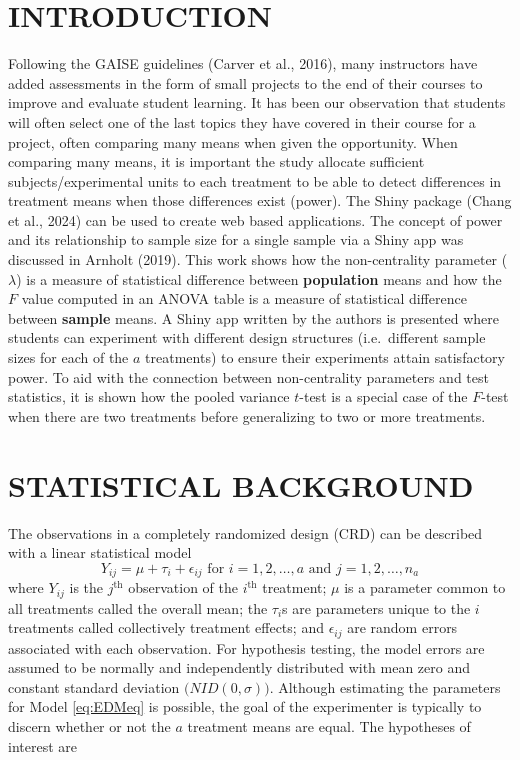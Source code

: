 \documentclass[
]{article}
\begin{document}
\hypertarget{introduction}{%
\section*{INTRODUCTION}\label{introduction}}

Following the GAISE guidelines (Carver et al., 2016), many instructors have added assessments in the form of small projects to the end of their courses to improve and evaluate student learning. It has been our observation that students will often select one of the last topics they have covered in their course for a project, often comparing many means when given the opportunity. When comparing many means, it is important the study allocate sufficient subjects/experimental units to each treatment to be able to detect differences in treatment means when those differences exist (power). The Shiny package (Chang et al., 2024) can be used to create web based applications. The concept of power and its relationship to sample size for a single sample via a Shiny app was discussed in Arnholt (2019). This work shows how the non-centrality parameter (\(\lambda\)) is a measure of statistical difference between \textbf{population} means and how the \(F\) value computed in an ANOVA table is a measure of statistical difference between \textbf{sample} means. A Shiny app written by the authors is presented where students can experiment with different design structures (i.e.~different sample sizes for each of the \(a\) treatments) to ensure their experiments attain satisfactory power. To aid with the connection between non-centrality parameters and test statistics, it is shown how the pooled variance \(t\)-test is a special case of the \(F\)-test when there are two treatments before generalizing to two or more treatments.

\hypertarget{statistical-background}{%
\section*{STATISTICAL BACKGROUND}\label{statistical-background}}

The observations in a completely randomized design (CRD) can be described with a linear statistical model
\begin{equation}
Y_{ij} = \mu + \tau_i + \epsilon_{ij} \text{ for }i=1, 2, \dots, a \text{ and } j
=1, 2, \dots, n_a
\label{eq:EDMeq}
\end{equation}
where \(Y_{ij}\) is the \(j^\text{th}\)
observation of the \(i^\text{th}\) treatment; \(\mu\) is a parameter common to all treatments called the overall mean; the \(\tau_i\)s are parameters unique to the \(i\) treatments called collectively treatment effects; and \(\epsilon_{ij}\) are random errors associated with each observation. For hypothesis testing, the model errors are assumed to be normally and independently distributed with mean zero and constant standard deviation \(\bigl(NID(0, \sigma)\bigr)\). Although estimating the parameters for Model \eqref{eq:EDMeq} is possible, the goal of the experimenter is typically to discern whether or not the \(a\) treatment means are equal. The hypotheses of interest are
\end{document}
